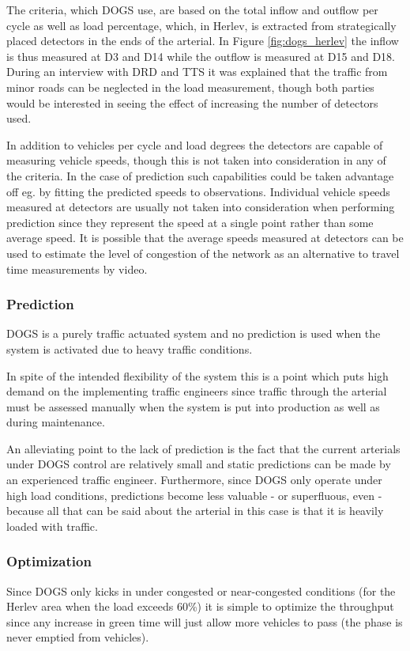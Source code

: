 The criteria, which DOGS use, are based on the total inflow and outflow per cycle as well as load percentage, which, in Herlev, is extracted from strategically placed detectors in the ends of the arterial. In Figure \ref{fig:dogs_herlev} the inflow is thus measured at D3 and D14 while the outflow is measured at D15 and D18. 
During an interview with DRD and TTS it was explained that the traffic from minor roads can be neglected in the load measurement, though both parties would be interested in seeing the effect of increasing the number of detectors used.

In addition to vehicles per cycle and load degrees the detectors are capable of measuring vehicle speeds, though this is not taken into consideration in any of the criteria. In the case of prediction such capabilities could be taken advantage off eg. by fitting the predicted speeds to observations.
Individual vehicle speeds measured at detectors are usually not taken into consideration when performing prediction since they represent the speed at a single point rather than some average speed. It is possible that the average speeds measured at detectors can be used to estimate the level of congestion of the network as an alternative to travel time measurements by video.

\subsubsection*{Prediction}
DOGS is a purely traffic actuated system and no prediction is used when the system is activated due to heavy traffic conditions.

In spite of the intended flexibility of the system this is a point which puts high demand on the implementing traffic engineers since traffic through the arterial must be assessed manually when the system is put into production as well as during maintenance.

An alleviating point to the lack of prediction is the fact that the current arterials under DOGS control are relatively small and static predictions can be made by an experienced traffic engineer. Furthermore, since DOGS only operate under high load conditions, predictions become less valuable - or superfluous, even - because all that can be said about the arterial in this case is that it is heavily loaded with traffic.

\subsubsection*{Optimization}
Since DOGS only kicks in under congested or near-congested conditions (for the Herlev area when the load exceeds 60\%) it is simple to optimize the throughput since any increase in green time will just allow more vehicles to pass (the phase is never emptied from vehicles).

